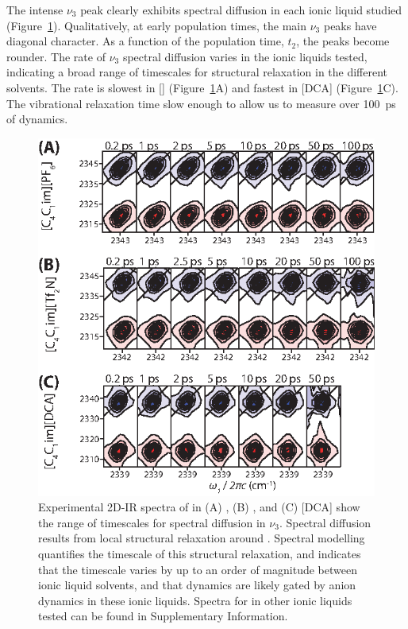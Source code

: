 The intense $\nu_3$ peak clearly exhibits spectral diffusion in each ionic liquid studied (Figure~\ref{fig:all 2D}). Qualitatively, at early population times, the main $\nu_3$ peaks have diagonal character. As a function of the population time, $t_2$, the peaks become rounder. The rate of $\nu_3$ spectral diffusion varies in the ionic liquids tested, indicating a broad range of timescales for structural relaxation in the different solvents. The rate is slowest in \ce{[Im_{4,1}]}[] (Figure~\ref{fig:all 2D}A) and fastest in \ce{[Im_{4,1}]}[DCA] (Figure~\ref{fig:all 2D}C). The vibrational relaxation time slow enough to allow us to measure over \SI{100}{\ps} of dynamics.
\begin{figure}
	\includegraphics[scale=1]{./anions/fig7.eps}
	\caption[Experimental 2D-IR spectra of  in \ce{[Im_{4,1}][X]}]{\label{fig:all 2D}Experimental 2D-IR spectra of  in \ce{[Im_{4,1}]} (A) \ce{[PF6]}, (B) \ce{[Tf2N]}, and (C) [DCA] show the range of timescales for spectral diffusion in $\nu_3$. Spectral diffusion results from local structural relaxation around . Spectral modelling quantifies the timescale of this structural relaxation, and indicates that the timescale varies by up to an order of magnitude between ionic liquid solvents, and that  dynamics are likely gated by anion dynamics in these ionic liquids. Spectra for  in other ionic liquids tested can be found in Supplementary Information.}
\end{figure}

